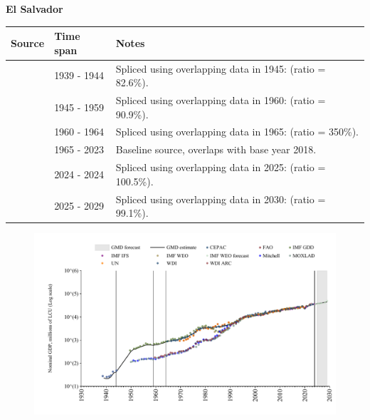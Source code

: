 \documentclass[12pt,a4paper,landscape]{article}
\begin{document}
\begin{adjustbox}{max totalsize={\paperwidth}{\paperheight},center}
\begin{minipage}[t][\textheight][t]{\textwidth}
\vspace*{0.5cm}
{}
\begin{center}
{\Large\bfseries El Salvador}
\end{center}
\vspace{0.5cm}
\begin{table}[H]
\centering
\small
\begin{tabular}{|l|l|l|}
\hline
\textbf{Source} & \textbf{Time span} & \textbf{Notes} \\
\hline
\rowcolor{white}\cite{Mitchell}& 1939 - 1944 &Spliced using overlapping data in 1945: (ratio = 82.6\%).\\
\rowcolor{lightgray}\cite{IMF_GDD}& 1945 - 1959 &Spliced using overlapping data in 1960: (ratio = 90.9\%).\\
\rowcolor{white}\cite{WDI_ARC}& 1960 - 1964 &Spliced using overlapping data in 1965: (ratio = 350\%).\\
\rowcolor{lightgray}\cite{WDI}& 1965 - 2023 &Baseline source, overlaps with base year 2018.\\
\rowcolor{white}\cite{IMF_IFS}& 2024 - 2024 &Spliced using overlapping data in 2025: (ratio = 100.5\%).\\
\rowcolor{lightgray}\cite{IMF_WEO_forecast}& 2025 - 2029 &Spliced using overlapping data in 2030: (ratio = 99.1\%).\\
\hline
\end{tabular}
\end{table}
\begin{figure}[H]
\centering
\includegraphics[width=\textwidth,height=0.6\textheight,keepaspectratio]{graphs/SLV_nGDP.pdf}
\end{figure}
\end{minipage}
\end{adjustbox}
\end{document}
